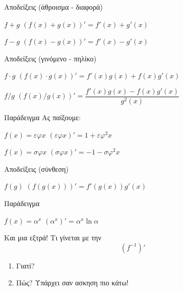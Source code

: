 \documentclass{presentation}
\begin{document}
\begin{frame}{Αποδείξεις (άθροισμα - διαφορά)}
  \begin{block}{$f+g$}
    $(f(x)+g(x))'=f'(x)+g'(x)$
  \end{block} \pause

  \begin{block}{$f-g$}
    $(f(x)-g(x))'=f'(x)-g'(x)$
  \end{block}
\end{frame}

\begin{frame}{Αποδείξεις (γινόμενο - πηλίκο)}
  \begin{block}{$f\cdot g$}
    $(f(x)\cdot g(x))'=f'(x)g(x)+f(x)g'(x)$
  \end{block} \pause

  \begin{block}{$f/g$}
    $(f(x)/g(x))'=\dfrac{f'(x)g(x)-f(x)g'(x)}{g^2(x)}$
  \end{block}
\end{frame}

\begin{frame}{Παράδειγμα}
  Ας παίξουμε:
  \begin{block}{$f(x)=εφx$}
    $(εφx)'=1+εφ^2x$
  \end{block} \pause

  \begin{block}{$f(x)=σφx$}
    $(σφx)'=-1-σφ^2x$
  \end{block}
\end{frame}

\begin{frame}{Αποδείξεις (σύνθεση)}
  \begin{block}{$f(g)$}
    $(f(g(x)))'=f'(g(x))g'(x)$
  \end{block}
\end{frame}

\begin{frame}{Παράδειγμα}
  \begin{block}{$f(x)=α^x$}
    $(α^x)'=α^x\ln α$
  \end{block}
\end{frame}

\begin{frame}{Και μια εξτρά!}
  Τι γίνεται με την $$(f^{-1})'$$
  \begin{enumerate}
    \item Γιατί?
    \item Πώς? Υπάρχει σαν ασκηση πιο κάτω!
  \end{enumerate}
\end{frame}
\end{document}
